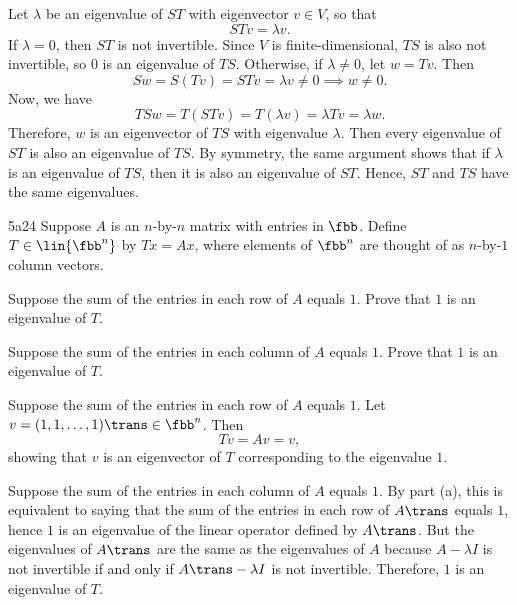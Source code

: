\begin{sol}
    Let $\lambda$ be an eigenvalue of $ST$ with eigenvector $v \in V$, so that
    \[
    	STv = \lambda v.
    \]
    If $\lambda = 0$, then $ST$ is not invertible. Since $V$ is finite-dimensional, $TS$ is also not invertible, so $0$ is an eigenvalue of $TS$.
    Otherwise, if $\lambda \neq 0$, let $w = Tv$.
    Then
    \[
    	Sw = S(Tv) = STv = \lambda v \neq 0 \implies w \neq 0.
    \]
    Now, we have
    \[
    	TSw = T(STv) = T(\lambda v) = \lambda Tv = \lambda w.
    \]
    Therefore, $w$ is an eigenvector of $TS$ with eigenvalue $\lambda$.
    Then every eigenvalue of $ST$ is also an eigenvalue of $TS$.
    By symmetry, the same argument shows that if $\lambda$ is an eigenvalue of $TS$, then it is also an eigenvalue of $ST$.
    Hence, $ST$ and $TS$ have the same eigenvalues.
\end{sol}

\begin{exercise}{5a24}
    Suppose $A$ is an $n$-by-$n$ matrix with entries in $\fbb$.
	Define $T \in \lin{\fbb^n}$ by $Tx = Ax$, where elements of $\fbb^n$ are thought of as $n$-by-$1$ column vectors.
    \begin{subexercises}
        \item Suppose the sum of the entries in each row of $A$ equals $1$.
	Prove that $1$ is an eigenvalue of $T$.
        \item Suppose the sum of the entries in each column of $A$ equals $1$.
	Prove that $1$ is an eigenvalue of $T$.
    \end{subexercises}
\end{exercise}

\begin{solenum}
    \item Suppose the sum of the entries in each row of $A$ equals $1$.
	Let $v = (1, 1, \ldots, 1)\trans \in \fbb^n$.
	Then
    \[
    	Tv = Av = v,
    \]
    showing that $v$ is an eigenvector of $T$ corresponding to the eigenvalue $1$.
    \item Suppose the sum of the entries in each column of $A$ equals $1$.
	By part (a), this is equivalent to saying that the sum of the entries in each row of $A\trans$ equals $1$, hence $1$ is an eigenvalue of the linear operator defined by $A\trans$.
	But the eigenvalues of $A\trans$ are the same as the eigenvalues of $A$ because $A - \lambda I$ is not invertible if and only if $A\trans - \lambda I$ is not invertible.
	Therefore, $1$ is an eigenvalue of $T$.
\end{solenum}


